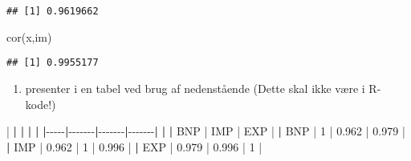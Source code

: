 \documentclass[
  12pt,
]{article}
\newenvironment{Shaded}{\begin{snugshade}}{\end{snugshade}}
\newcommand{\DecValTok}[1]{\textcolor[rgb]{0.00,0.00,0.81}{#1}}
\newcommand{\ErrorTok}[1]{\textcolor[rgb]{0.64,0.00,0.00}{\textbf{#1}}}
\newcommand{\FloatTok}[1]{\textcolor[rgb]{0.00,0.00,0.81}{#1}}
\newcommand{\FunctionTok}[1]{\textcolor[rgb]{0.00,0.00,0.00}{#1}}
\newcommand{\NormalTok}[1]{#1}
\newcommand{\SpecialCharTok}[1]{\textcolor[rgb]{0.00,0.00,0.00}{#1}}
\providecommand{\tightlist}{%
  \setlength{\itemsep}{0pt}\setlength{\parskip}{0pt}}
\begin{document}
\begin{verbatim}
## [1] 0.9619662
\end{verbatim}

\begin{Shaded}
\begin{Highlighting}[]
\FunctionTok{cor}\NormalTok{(x,im)}
\end{Highlighting}
\end{Shaded}

\begin{verbatim}
## [1] 0.9955177
\end{verbatim}

\begin{enumerate}
\def\labelenumi{\arabic{enumi}.}
\setcounter{enumi}{1}
\tightlist
\item
  presenter i en tabel ved brug af nedenstående (Dette skal ikke være i
  R-kode!)
\end{enumerate}

\begin{Shaded}
\begin{Highlighting}[]
\SpecialCharTok{|}     \ErrorTok{|}       \ErrorTok{|}       \ErrorTok{|}       \ErrorTok{|}
\ErrorTok{|}\SpecialCharTok{{-}{-}{-}{-}{-}}\ErrorTok{|}\SpecialCharTok{{-}{-}{-}{-}{-}{-}{-}}\ErrorTok{|}\SpecialCharTok{{-}{-}{-}{-}{-}{-}{-}}\ErrorTok{|}\SpecialCharTok{{-}{-}{-}{-}{-}{-}{-}}\ErrorTok{|}
\ErrorTok{|}     \ErrorTok{|}\NormalTok{ BNP   }\SpecialCharTok{|}\NormalTok{ IMP   }\SpecialCharTok{|}\NormalTok{ EXP   }\SpecialCharTok{|}
\ErrorTok{|}\NormalTok{ BNP }\SpecialCharTok{|} \DecValTok{1}     \SpecialCharTok{|} \FloatTok{0.962} \SpecialCharTok{|} \FloatTok{0.979} \SpecialCharTok{|}
\ErrorTok{|}\NormalTok{ IMP }\SpecialCharTok{|} \FloatTok{0.962} \SpecialCharTok{|} \DecValTok{1}     \SpecialCharTok{|} \FloatTok{0.996} \SpecialCharTok{|}
\ErrorTok{|}\NormalTok{ EXP }\SpecialCharTok{|} \FloatTok{0.979} \SpecialCharTok{|} \FloatTok{0.996} \SpecialCharTok{|} \DecValTok{1}     \SpecialCharTok{|}
\end{Highlighting}
\end{Shaded}


  
\end{document}
